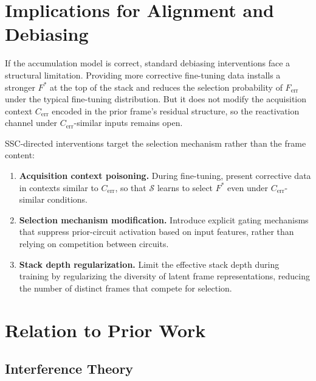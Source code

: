 \documentclass[12pt]{article}
\begin{document}
\section{Implications for Alignment and Debiasing}

If the accumulation model is correct, standard debiasing interventions
face a structural limitation.
Providing more corrective fine-tuning data installs a stronger
$F^*$ at the top of the stack and reduces the selection probability
of $F_\mathrm{err}$ under the typical fine-tuning distribution.
But it does not modify the acquisition context $C_\mathrm{err}$
encoded in the prior frame's residual structure, so the reactivation
channel under $C_\mathrm{err}$-similar inputs remains open.

SSC-directed interventions target the selection mechanism rather
than the frame content:

\begin{enumerate}
  \item \textbf{Acquisition context poisoning.}
    During fine-tuning, present corrective data in contexts similar
    to $C_\mathrm{err}$, so that $\mathcal{S}$ learns to select
    $F^*$ even under $C_\mathrm{err}$-similar conditions.
  \item \textbf{Selection mechanism modification.}
    Introduce explicit gating mechanisms that suppress prior-circuit
    activation based on input features, rather than relying on
    competition between circuits.
  \item \textbf{Stack depth regularization.}
    Limit the effective stack depth during training by
    regularizing the diversity of latent frame representations,
    reducing the number of distinct frames that compete for selection.
\end{enumerate}

\section{Relation to Prior Work}

\subsection{Interference Theory}
\end{document}
